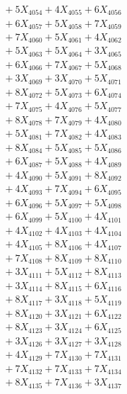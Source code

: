 \documentclass[a4paper,10pt]{article}
\begin{document}
{\begin{align}
&\;  + 5 X_{4054} + 4 X_{4055} + 6 X_{4056} \\[0.3ex]
&\;  + 6 X_{4057} + 5 X_{4058} + 7 X_{4059} \\[0.5ex]\allowbreak
&\;  + 7 X_{4060} + 5 X_{4061} + 4 X_{4062} \\[0.3ex]
&\;  + 5 X_{4063} + 5 X_{4064} + 3 X_{4065} \\[0.3ex]
&\;  + 6 X_{4066} + 7 X_{4067} + 5 X_{4068} \\[0.3ex]
&\;  + 3 X_{4069} + 3 X_{4070} + 5 X_{4071} \\[0.3ex]
&\;  + 8 X_{4072} + 5 X_{4073} + 6 X_{4074} \\[0.3ex]
&\;  + 7 X_{4075} + 4 X_{4076} + 5 X_{4077} \\[0.3ex]
&\;  + 8 X_{4078} + 7 X_{4079} + 4 X_{4080} \\[0.3ex]
&\;  + 5 X_{4081} + 7 X_{4082} + 4 X_{4083} \\[0.3ex]
&\;  + 8 X_{4084} + 5 X_{4085} + 5 X_{4086} \\[0.3ex]
&\;  + 6 X_{4087} + 5 X_{4088} + 4 X_{4089} \\[0.5ex]\allowbreak
&\;  + 4 X_{4090} + 5 X_{4091} + 8 X_{4092} \\[0.3ex]
&\;  + 4 X_{4093} + 7 X_{4094} + 6 X_{4095} \\[0.3ex]
&\;  + 6 X_{4096} + 5 X_{4097} + 5 X_{4098} \\[0.3ex]
&\;  + 6 X_{4099} + 5 X_{4100} + 4 X_{4101} \\[0.3ex]
&\;  + 4 X_{4102} + 4 X_{4103} + 4 X_{4104} \\[0.3ex]
&\;  + 4 X_{4105} + 8 X_{4106} + 4 X_{4107} \\[0.3ex]
&\;  + 7 X_{4108} + 8 X_{4109} + 8 X_{4110} \\[0.3ex]
&\;  + 3 X_{4111} + 5 X_{4112} + 8 X_{4113} \\[0.3ex]
&\;  + 3 X_{4114} + 8 X_{4115} + 6 X_{4116} \\[0.3ex]
&\;  + 8 X_{4117} + 3 X_{4118} + 5 X_{4119} \\[0.5ex]\allowbreak
&\;  + 8 X_{4120} + 3 X_{4121} + 6 X_{4122} \\[0.3ex]
&\;  + 8 X_{4123} + 3 X_{4124} + 6 X_{4125} \\[0.3ex]
&\;  + 3 X_{4126} + 3 X_{4127} + 3 X_{4128} \\[0.3ex]
&\;  + 4 X_{4129} + 7 X_{4130} + 7 X_{4131} \\[0.3ex]
&\;  + 7 X_{4132} + 7 X_{4133} + 7 X_{4134} \\[0.3ex]
&\;  + 8 X_{4135} + 7 X_{4136} + 3 X_{4137} \\[0.3ex]

\end{align}}
\end{document}
